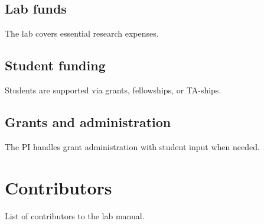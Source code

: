 \documentclass[11pt]{article}
\begin{document}
\subsection{Lab funds}
The lab covers essential research expenses.

\subsection{Student funding}
Students are supported via grants, fellowships, or TA-ships.

\subsection{Grants and administration}
The PI handles grant administration with student input when needed.

\section*{Contributors}
List of contributors to the lab manual.
\end{document}
